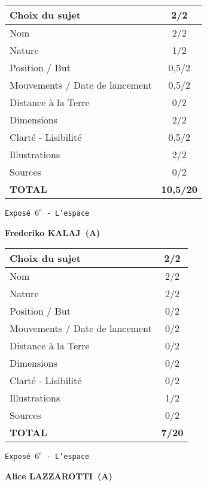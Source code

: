 	\vspace*{2cm}
	\begin{tabular}{|l|c|}
		\hline
		Choix du sujet & 2/2 \\
		\hline
		Nom & 2/2 \\
		\hline
		Nature & 1/2 \\
		\hline
		Position / But & 0,5/2 \\
		\hline
		Mouvements / Date de lancement & 0,5/2 \\
		\hline
		Distance \`a la Terre & 0/2 \\
		\hline
		Dimensions & 2/2 \\
		\hline
		Clart\'e - Lisibilit\'e & 0,5/2 \\
		\hline
		Illustrations & 2/2 \\
		\hline
		Sources & 0/2 \\
		\hline
		\textbf{TOTAL}  & \textbf{10,5/20} \\
		\hline
	\end{tabular}
	\newline
	\LARGE{\texttt{Expos\'e $6^e$ - L'espace}}
	\vspace*{1cm}

	\textbf{Frederiko KALAJ\ (A)}

	\vspace*{2cm}
	\begin{tabular}{|l|c|}
		\hline
		Choix du sujet & 2/2 \\
		\hline
		Nom & 2/2 \\
		\hline
		Nature & 2/2 \\
		\hline
		Position / But & 0/2 \\
		\hline
		Mouvements / Date de lancement & 0/2 \\
		\hline
		Distance \`a la Terre & 0/2 \\
		\hline
		Dimensions & 0/2 \\
		\hline
		Clart\'e - Lisibilit\'e & 0/2 \\
		\hline
		Illustrations & 1/2 \\
		\hline
		Sources & 0/2 \\
		\hline
		\textbf{TOTAL}  & \textbf{7/20} \\
		\hline
	\end{tabular}
	\newline
	\LARGE{\texttt{Expos\'e $6^e$ - L'espace}}
	\vspace*{1cm}

	\textbf{Alice LAZZAROTTI\ (A)}

